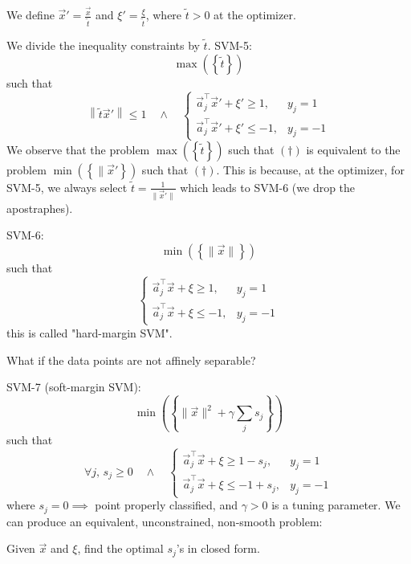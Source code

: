 \documentclass{article}
\begin{document}
We define $\vec{x}' = \frac{\vec{x}}{\widetilde{t}}$ and $\xi' = \frac{\xi}{\widetilde{t}}$, where $\widetilde{t} > 0$ at the optimizer.

We divide the inequality constraints by $\widetilde{t}$. SVM-5:
\[
    \max\left(\left\{\widetilde{t}\right\}\right)
\]
such that
\[
    \left\|\widetilde{t}\vec{x}'\right\| \leq 1 \quad \wedge \quad \begin{cases}
        \vec{a}_j^\top \vec{x}' + \xi' \geq 1, & y_j = 1 \\
        \vec{a}_j^\top \vec{x}' + \xi' \leq -1, & y_j = -1
    \end{cases} \tag{$\dag$}
\]
We observe that the problem $ \max\left(\left\{\widetilde{t}\right\}\right)$ such that $(\dag)$ is equivalent to the problem $\min\left(\left\{\|\vec{x}'\right\}\right)$ such that $(\dag)$. This is because, at the optimizer, for SVM-5, we always select $\widetilde{t} = \frac{1}{\|\vec{x}'\|}$ which leads to SVM-6 (we drop the apostraphes).

SVM-6:
\[
    \min\left(\left\{\|\vec{x}\|\right\}\right)
\]
such that
\[
    \begin{cases}
        \vec{a}_j^\top \vec{x} + \xi \geq 1, & y_j = 1 \\
        \vec{a}_j^\top \vec{x} + \xi \leq -1, & y_j = -1
    \end{cases}
\]
this is called "hard-margin SVM".

What if the data points are not affinely separable?

SVM-7 (soft-margin SVM):
\[
    \min\left(\left\{\|\vec{x}\|^2 + \gamma \sum_j s_j\right\}\right)
\]
such that
\[
    \forall j,\, s_j \geq 0 \quad \wedge \quad \begin{cases}
        \vec{a}_j^\top \vec{x} + \xi \geq 1 - s_j, & y_j = 1 \\
        \vec{a}_j^\top \vec{x} + \xi \leq -1 + s_j, & y_j = -1
    \end{cases}
\]
where $s_j = 0 \implies$ point properly classified, and $\gamma > 0$ is a tuning parameter. We can produce an equivalent, unconstrained, non-smooth problem:

Given $\vec{x}$ and $\xi$, find the optimal $s_j$'s in closed form.
\end{document}
